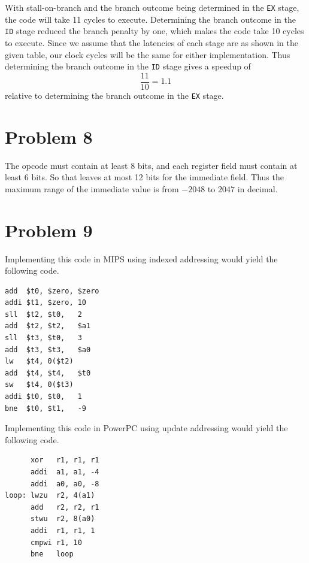 \documentclass[12pt]{article}
\begin{document}
With stall-on-branch and the branch outcome being determined in the \texttt{EX} stage, the code will take 11 cycles to execute. Determining the branch
outcome in the \texttt{ID} stage reduced the branch penalty by one, which makes the code take 10 cycles to execute. Since we assume that the latencies
of each stage are as shown in the given table, our clock cycles will be the same for either implementation. Thus determining the branch outcome in the \texttt{ID}
stage gives a speedup of
\[\frac{11}{10}=1.1\]
relative to determining the branch outcome in the \texttt{EX} stage.

\section*{Problem 8}

The opcode must contain at least 8 bits, and each register field must contain at least 6 bits. So that leaves at most 12 bits for the immediate field.
Thus the maximum range of the immediate value is from \(-2048\) to \(2047\) in decimal.

\section*{Problem 9}

Implementing this code in MIPS using indexed addressing would yield the following code.
\begin{verbatim}
add  $t0, $zero, $zero
addi $t1, $zero, 10
sll  $t2, $t0,   2
add  $t2, $t2,   $a1
sll  $t3, $t0,   3
add  $t3, $t3,   $a0
lw   $t4, 0($t2)
add  $t4, $t4,   $t0
sw   $t4, 0($t3)
addi $t0, $t0,   1
bne  $t0, $t1,   -9
\end{verbatim}
Implementing this code in PowerPC using update addressing would yield the following code.
\begin{verbatim}
      xor   r1, r1, r1
      addi  a1, a1, -4
      addi  a0, a0, -8
loop: lwzu  r2, 4(a1)
      add   r2, r2, r1
      stwu  r2, 8(a0)
      addi  r1, r1, 1
      cmpwi r1, 10
      bne   loop
\end{verbatim}
\end{document}
